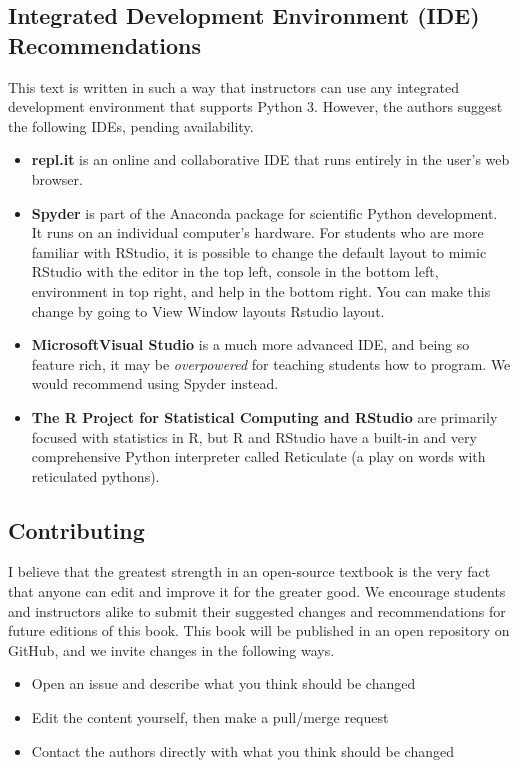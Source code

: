 \subsection*{Integrated Development Environment (IDE) Recommendations}
This text is written in such a way that instructors can use any integrated development environment that supports Python 3. However, the authors suggest the following IDEs, pending availability.
\begin{itemize}
    \item {\textbf{repl.it\textregistered} is an online and collaborative IDE that runs entirely in the user's web browser.}
    \item {\textbf{Spyder} is part of the Anaconda package for scientific Python development. It runs on an individual computer's hardware. For students who are more familiar with RStudio, it is possible to change the default layout to mimic RStudio with the editor in the top left, console in the bottom left, environment in top right, and help in the bottom right. You can make this change by going to View \textrangle{} Window layouts \textrangle{} Rstudio layout.}
    \item {\textbf{Microsoft\textregistered Visual Studio} is a much more advanced IDE, and being so feature rich, it may be \textit{overpowered} for teaching students how to program. We would recommend using Spyder instead.}
    \item {\textbf{The R Project for Statistical Computing and RStudio} are primarily focused with statistics in R, but R and RStudio have a built-in and very comprehensive Python interpreter called Reticulate (a play on words with reticulated pythons).}
\end{itemize}
\subsection*{Contributing}
I believe that the greatest strength in an open-source textbook is the very fact that anyone can edit and improve it for the greater good. We encourage students and instructors alike to submit their suggested changes and recommendations for future editions of this book. This book will be published in an open repository on GitHub, and we invite changes in the following ways.
\begin{itemize}
    \item {Open an issue and describe what you think should be changed}
    \item {Edit the content yourself, then make a pull/merge request}
    \item {Contact the authors directly with what you think should be changed}
\end{itemize}
